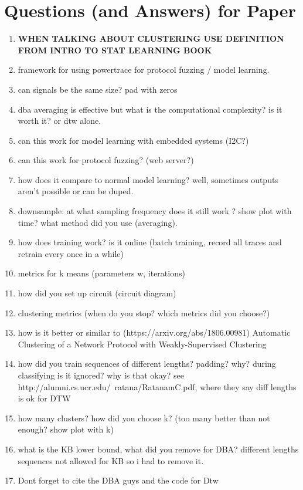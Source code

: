 \documentclass[11pt, a4paper]{article}
\begin{document}
\section*{Questions (and Answers) for Paper}
\begin{enumerate}
    \item \textbf{WHEN TALKING ABOUT CLUSTERING USE DEFINITION FROM INTRO TO STAT LEARNING BOOK}
    \item framework for using powertrace for protocol fuzzing / model learning.
    \item can signals be the same size? pad with zeros
    \item dba averaging is effective but what is the computational complexity? is it worth it? or dtw alone.
    \item can this work for model learning with embedded systems (I2C?)
    \item can this work for protocol fuzzing? (web server?)
    \item how does it compare to normal model learning? well, sometimes outputs aren't possible or can be duped.
    \item downsample: at what sampling frequency does it still work ? show plot with time? what method did you use (averaging).
    \item how does training work? is it online (batch training, record all traces and retrain every once in a while)
    \item metrics for k means (parameters w, iterations)
    \item how did you set up circuit (circuit diagram)
    \item clustering metrics (when do you stop? which metrics did you choose?)
    \item how is it better or similar to (https://arxiv.org/abs/1806.00981) Automatic Clustering of a Network Protocol with Weakly-Supervised Clustering
    \item how did you train sequences of different lengths? padding? why? during classifying is it ignored? why is that okay? see http://alumni.cs.ucr.edu/~ratana/RatanamC.pdf, where they say diff lengths is ok for DTW
    \item how many clusters? how did you choose k? (too many better than not enough? show plot with k)
    \item what is the KB lower bound, what did you remove for DBA? different lengths sequences not allowed for KB so i had to remove it.
    \item Dont forget to cite the DBA guys and the code for Dtw

\end{enumerate}

\nocite*{}
{}

\end{document}

